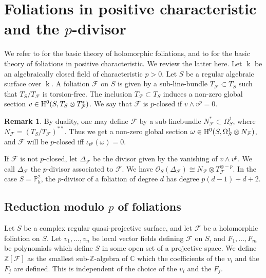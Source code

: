 \documentclass[reqno,oneside,11pt]{amsart}
\theoremstyle{definition}
\newtheorem{OBS}[thm]{Remark}
\DeclareMathOperator{\field}{k}
\begin{document}
\section{Foliations in positive characteristic and the \texorpdfstring{$p$}{p}-divisor}\label{pdivisoremP2}


We refer to \cite{MR3328860} for the basic theory of holomorphic foliations, and to \cite{mendson2023arithmetic} for the basic theory of foliations in positive characteristic. We review the latter here. Let $\field$ be an algebraically closed field of characteristic $p > 0$. Let $S$ be a regular algebraic surface over $\field$. A foliation $\mathcal{F}$ on $S$ is given by a sub-line-bundle $T_{\mathcal{F}} \subset T_{S}$ such that $T_{S}/T_{\mathcal{F}}$ is torsion-free. The inclusion $T_\mathcal{F} \subset T_{S}$ induces a non-zero global section $v \in {\rm H}^0(S, T_{S} \otimes T_{\mathcal{F}}^*)$. We say that $\mathcal{F}$ is $p$-closed if $v \wedge v^p = 0$.

\begin{OBS}
    By duality, one may define $\mathcal{F}$ by a sub linebundle $N_\mathcal{F}^* \subset \Omega_S^1$, where $N_\mathcal{F} = (T_S/T_\mathcal{F})^{**}$. Thus we get a non-zero global section $\omega \in {\rm H}^0(S, \Omega_S^1 \otimes N_\mathcal{F})$, and $\mathcal{F}$ will be $p$-closed iff $\iota_{v^p}(\omega) = 0$.
\end{OBS}

If $\mathcal{F}$ is not $p$-closed, let $\Delta_{\mathcal{F}}$ be the divisor given by the vanishing of $v \wedge v^p$. We call $\Delta_{\mathcal{F}}$ the $p$-divisor associated to $\mathcal{F}$. We have $\mathcal{O}_S(\Delta_\mathcal{F}) \cong N_\mathcal{F} \otimes T_\mathcal{F}^{\otimes -p}$. In the case $S = \mathbb{P}^2_{\field}$, the $p$-divisor of a foliation of degree $d$ has degree $p(d-1)+d+2$.


\subsection{Reduction modulo \texorpdfstring{$p$}{p} of foliations}

Let $S$ be a complex regular quasi-projective surface, and let $\mathcal{F}$ be a holomorphic foliation on $S$. Let $v_1, \dots, v_n$ be local vector fields defining $\mathcal{F}$ on $S$, and $F_1,\dots,F_m$ be polynomials which define $S$ in some open set of a projective space. We define $\mathbb{Z}[\mathcal{F}]$ as the smallest sub-$\mathbb{Z}$-algebra of $\mathbb{C}$ which the coefficients of the $v_i$ and the $F_j$ are defined. This is independent of the choice of the $v_i$ and the $F_j$. 
\end{document}
